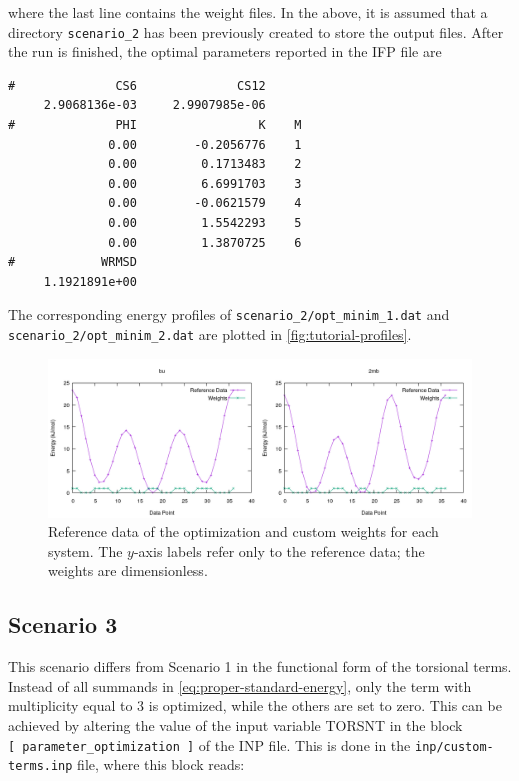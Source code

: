\documentclass[10pt,a4paper,openany]{memoir}
\numberwithin{equation}{section}
\newcommand{\under}{\_}
\begin{document}
\noindent where the last line contains the weight files.
%
In the above, it is assumed that a directory
\texttt{scenario\under{}2} has been previously created to store the
output files.
%
After the run is finished, the optimal parameters reported in the IFP
file are

\begin{lstlisting}
#              CS6              CS12
     2.9068136e-03     2.9907985e-06
#              PHI                 K    M
              0.00        -0.2056776    1
              0.00         0.1713483    2
              0.00         6.6991703    3
              0.00        -0.0621579    4
              0.00         1.5542293    5
              0.00         1.3870725    6
#            WRMSD
     1.1921891e+00
\end{lstlisting}\vspace{1ex}\par

\noindent The corresponding energy profiles of
\texttt{scenario\under{}2/opt\under{}minim\under{}1.dat} and
\texttt{scenario\under{}2/opt\under{}minim\under{}2.dat} are plotted
in \autoref{fig:tutorial-profiles}.

\begin{figure}[tb]
  \centering
  \includegraphics[width=\textwidth]{qm-and-weis}
  \caption{Reference data of the optimization and custom weights for
    each system. The $y$-axis labels refer only to the reference data;
    the weights are dimensionless.}
  \label{fig:qm-and-wei}
\end{figure}

\subsection{Scenario 3}
\label{sec:tutorial-scenario-3}

This scenario differs from Scenario 1 in the functional form of the
torsional terms.
%
Instead of all summands in \autoref{eq:proper-standard-energy}, only
the term with multiplicity equal to 3 is optimized, while the others
are set to zero.
%
This can be achieved by altering the value of the input variable
TORSNT in the block \texttt{[~parameter\under{}optimization~]} of the
INP file.
%
This is done in the \texttt{inp/custom-terms.inp} file, where this
block reads:
\end{document}

